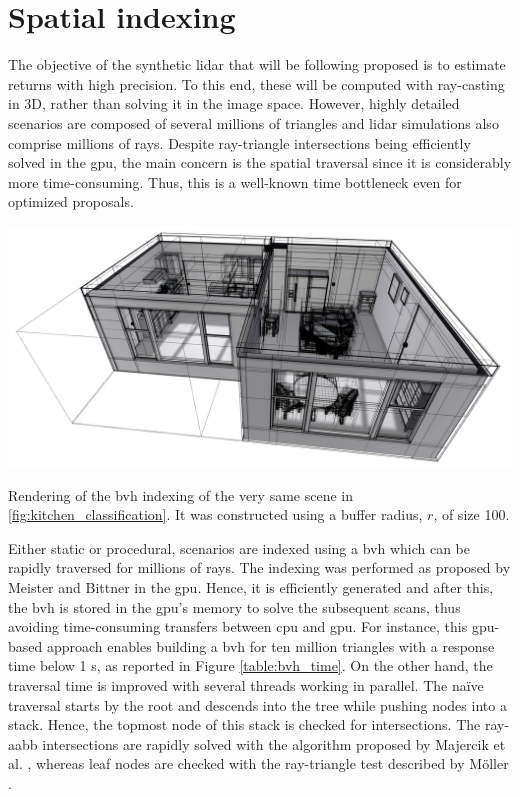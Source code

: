 \section{Spatial indexing}

The objective of the synthetic \acrshort{lidar} that will be following proposed is to estimate returns with high precision. To this end, these will be computed with ray-casting in 3D, rather than solving it in the image space. However, highly detailed scenarios are composed of several millions of triangles and \acrshort{lidar} simulations also comprise millions of rays. Despite ray-triangle intersections being efficiently solved in the \acrshort{gpu}, the main concern is the spatial traversal since it is considerably more time-consuming. Thus, this is a well-known time bottleneck even for optimized proposals. 

\begin{marginfigure}[.cm]
    \centering
    \includegraphics[width=\linewidth]{figs/lidar_simulation/bvh_rendering.png}
	\caption{Rendering of the \acrshort{bvh} indexing of the very same scene in \ref{fig:kitchen_classification}. It was constructed using a buffer radius, $r$, of size 100.}
	\label{fig:lidar_bvh_rendering}
\end{marginfigure}
Either static or procedural, scenarios are indexed using a \acrshort{bvh} which can be rapidly traversed for millions of rays. The indexing was performed as proposed by Meister and Bittner \cite{meister_parallel_2018} in the \acrshort{gpu}. Hence, it is efficiently generated and after this, the \acrshort{bvh} is stored in the \acrshort{gpu}'s memory to solve the subsequent scans, thus avoiding time-consuming transfers between \acrshort{cpu} and \acrshort{gpu}. For instance, this \acrshort{gpu}-based approach enables building a \acrshort{bvh} for ten million triangles with a response time below 1 \si{\second}, as reported in Figure \ref{table:bvh_time}. On the other hand, the traversal time is improved with several threads working in parallel. The naïve traversal starts by the root and descends into the tree while pushing nodes into a stack. Hence, the topmost node of this stack is checked for intersections. The ray-\acrshort{aabb} intersections are rapidly solved with the algorithm proposed by Majercik et al. \cite{majercik_ray-box_2018}, whereas leaf nodes are checked with the ray-triangle test described by Möller \cite{moller_fast_1997}.


